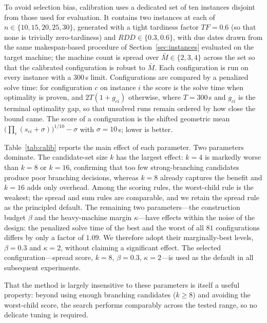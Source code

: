 \documentclass[review,3p,times,authoryear]{elsarticle}
\begin{document}
To avoid selection bias, calibration uses a dedicated set of ten instances
disjoint from those used for evaluation. It contains two instances at each of
$n\in\{10,15,20,25,30\}$, generated with a tight tardiness factor $TF=0.6$ (so
that none is trivially zero-tardiness) and $RDD\in\{0.3,0.6\}$, with due dates
drawn from the same makespan-based procedure of Section~\ref{sec:instances}
evaluated on the target machine; the machine count is spread over
$\bar M\in\{2,3,4\}$ across the set so that the calibrated configuration is robust
to $\bar M$. Each configuration is run on every instance with a $300$\,s limit.
Configurations are compared by a penalized solve time: for configuration $c$ on
instance $i$ the score is the solve time when optimality is proven, and
$2T(1+g_{ci})$ otherwise, where $T=300$\,s and $g_{ci}$ is the terminal
optimality gap, so that unsolved runs remain ordered by how close the bound came.
The score of a configuration is the shifted geometric mean
$\big(\prod_i (s_{ci}+\sigma)\big)^{1/10}-\sigma$ with $\sigma=10$\,s; lower is
better.

Table~\ref{tab:calib} reports the main effect of each parameter. Two parameters
dominate. The candidate-set size $k$ has the largest effect: $k=4$ is markedly
worse than $k=8$ or $k=16$, confirming that too few strong-branching candidates
produce poor branching decisions, whereas $k=8$ already captures the benefit and
$k=16$ adds only overhead. Among the scoring rules, the worst-child rule is the
weakest; the spread and sum rules are comparable, and we retain the spread rule as
the principled default. The remaining two parameters---the construction budget
$\beta$ and the heavy-machine margin $\kappa$---have effects within the noise of
the design: the penalized solve time of the best and the worst of all $81$
configurations differs by only a factor of $1.09$. We therefore adopt their
marginally-best levels, $\beta=0.3$ and $\kappa=2$, without claiming a significant
effect. The selected configuration---spread score, $k=8$, $\beta=0.3$,
$\kappa=2$---is used as the default in all subsequent experiments.

That the method is largely insensitive to these parameters is itself a useful
property: beyond using enough branching candidates ($k\ge 8$) and avoiding the
worst-child score, the search performs comparably across the tested range, so no
delicate tuning is required.
\end{document}
